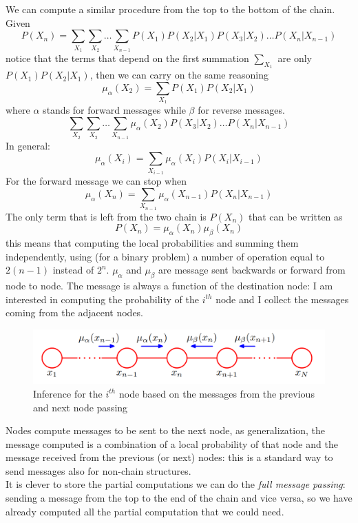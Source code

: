         We can compute a similar procedure from the top to the bottom of the chain. Given
        $$P(X_n) = \sum_{X_1} \sum_{X_2} \dots \sum_{X_{n-1}} P(X_1)P(X_2|X_1)P(X_3|X_2)\dots P(X_n|X_{n-1})$$ 
        notice that the terms that depend on the first summation $\sum_{X_1}$ are only $P(X_1)P(X_2|X_1)$, then we can carry on the same reasoning
        $$\mu_\alpha (X_{2}) = \sum _{X_1} P(X_1)P(X_2|X_{1})$$
        where $\alpha$ stands for forward messages while $\beta$ for reverse messages.
        $$\sum_{X_2}\sum_{X_2}\dots \sum_{X_{n-1}} \mu_{\alpha}(X_2) P(X_3|X_2) \dots P(X_{n}|X_{n-1})$$
        In general: 
        $$\mu_\alpha (X_{i}) = \sum _{X_{i-1}} \mu_\alpha(X_{i}) P(X_i|X_{i-1})$$
        For the forward message we can stop when
        $$\mu_\alpha (X_{n}) = \sum_{X_{n-1}} \mu_\alpha (X_{n-1}) P(X_n|X_{n-1})$$
        The only term that is left from the two chain is $P(X_n)$ that can be written as
        $$P(X_n) = \mu_\alpha (X_n) \mu_\beta(X_n)$$
        this means that computing the local probabilities and summing them independently, using (for a binary problem) a number of operation equal to $2(n-1)$ instead of $2^n$. $\mu_\alpha$ and $\mu_\beta$ are message sent backwards or forward from node to node. 
        The message is always a function of the destination node: I am interested in computing the probability of the $i^{th}$ node and I collect the messages coming from the adjacent nodes.
        \begin{figure}[h]
            \centering
            \includegraphics[scale=0.3]{images/chain_inference_message_passing.png}
            \caption{Inference for the $i^{th}$ node based on the messages from the previous and next node passing}
            \label{fig:message_passing_inference_BN_chain}
        \end{figure}
        Nodes compute messages to be sent to the next node, as generalization, the message computed is a combination of a local probability of that node and the message received from the previous (or next) nodes: this is a standard way to send messages also for non-chain structures.\\
        
        It is clever to store the partial computations we can do the \textit{full message passing}: sending a message from the top to the end of the chain and vice versa, so we have already computed all the partial computation that we could need.\\
    
